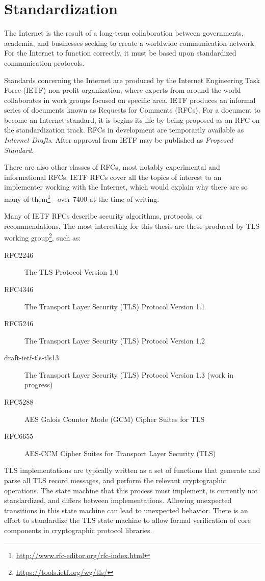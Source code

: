 \section{Standardization}

The Internet is the result of a long-term collaboration between governments, academia, and businesses seeking to create a worldwide communication network. For the Internet to function correctly, it must be based upon standardized communication protocols.

Standards concerning the Internet are produced by the Internet Engineering Task Force (IETF) non-profit organization, where experts from around the world collaborates in work groups focused on specific area. IETF produces an informal series of documents known as Requests for Comments (RFCs). For a document to become an Internet standard, it is begins its life by being proposed as an RFC on the standardization track. RFCs in development are temporarily available as \textit{Internet Drafts}. After approval from IETF may be published as \textit{Proposed Standard}. \cite{dent2004user}

There are also other classes of RFCs, most notably experimental and informational RFCs. IETF RFCs cover all the topics of interest to an implementer working with the Internet, which would explain why there are so many of them\footnote{\url{http://www.rfc-editor.org/rfc-index.html}} - over 7400 at the time of writing.

Many of IETF RFCs describe security algorithms, protocols, or recommendations. The most interesting for this thesis are these produced by TLS working group\footnote{\url{https://tools.ietf.org/wg/tls/}}, such as:

\begin{description}
  \item[RFC2246] The TLS Protocol Version 1.0
  \item[RFC4346] The Transport Layer Security (TLS) Protocol Version 1.1
  \item[RFC5246] The Transport Layer Security (TLS) Protocol Version 1.2
  \item[draft-ietf-tls-tls13] The Transport Layer Security (TLS) Protocol Version 1.3 (work in progress)
  \item[RFC5288] AES Galois Counter Mode (GCM) Cipher Suites for TLS
  \item[RFC6655] AES-CCM Cipher Suites for Transport Layer Security (TLS)
\end{description}

TLS implementations are typically written as a set of functions that generate and parse all TLS record messages, and perform the relevant cryptographic operations. The state machine that this process must implement, is currently not standardized, and differs between implementations. Allowing unexpected transitions in this state machine can lead to unexpected behavior. There is an effort to standardize the TLS state machine to allow formal verification of core components in cryptographic protocol libraries. \cite{tls-state-machine}
